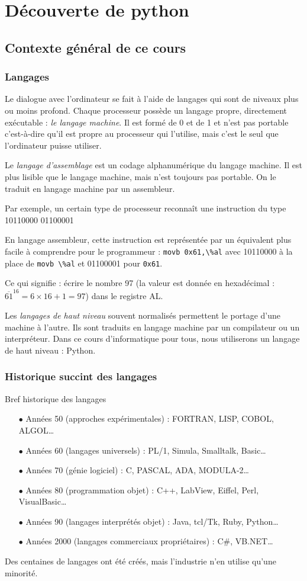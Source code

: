\chapter{Découverte de python}
\section{Contexte général de ce cours}
\subsection{Langages}
Le dialogue avec l'ordinateur se fait à l'aide de langages qui sont de niveaux plus ou moins profond. Chaque processeur possède un langage propre, directement exécutable : \emph{le langage machine}. Il est
formé de 0 et de 1 et n'est pas portable c'est-à-dire qu'il est propre au processeur qui l'utilise, mais c'est le seul que l'ordinateur puisse utiliser.\par
Le \emph{langage d'assemblage} est un codage alphanumérique du langage machine. Il est plus lisible que le langage machine, mais n'est toujours pas portable. On le traduit en langage machine par un assembleur.\par
Par exemple, un certain type de processeur  reconnaît une instruction du type
 10110000 01100001\par
En langage assembleur, cette instruction est représentée par un équivalent plus facile à  comprendre pour le programmeur : \lstinline?movb 0x61,\%al? avec 10110000 à la place de \lstinline?movb \%al? et 01100001 pour {\tt 0x61}.\par
Ce qui signifie : \og écrire le nombre 97 (la valeur est donnée en hexadécimal : $\overline{61}^{16}=6\times 16+1 = 97$) dans le registre AL\fg.\par
Les \emph{langages de haut niveau} souvent normalisés permettent le portage d'une machine à l'autre.
Ils sont traduits en langage machine par un compilateur ou un interpréteur. Dans ce cours d'informatique pour tous, nous utiliserons un langage de haut niveau : Python.
\subsection{Historique succint des langages}
Bref historique des langages
\begin{itemize}
\item [$\bullet$] Années 50 (approches expérimentales) : FORTRAN, LISP, COBOL, ALGOL\dots
\item [$\bullet$] Années 60 (langages universels) : PL/1, Simula, Smalltalk, Basic\dots
\item [$\bullet$] Années 70 (génie logiciel) : C, PASCAL, ADA, MODULA-2\dots
\item [$\bullet$] Années 80 (programmation objet) : C++, LabView, Eiffel, Perl, VisualBasic\dots
\item [$\bullet$] Années 90 (langages interprétés objet) : Java, tcl/Tk, Ruby, Python\dots
\item [$\bullet$] Années 2000 (langages commerciaux propriétaires) : C\#, VB.NET\dots
\end{itemize}
Des centaines de langages ont été créés, mais l'industrie n'en utilise qu'une minorité.

